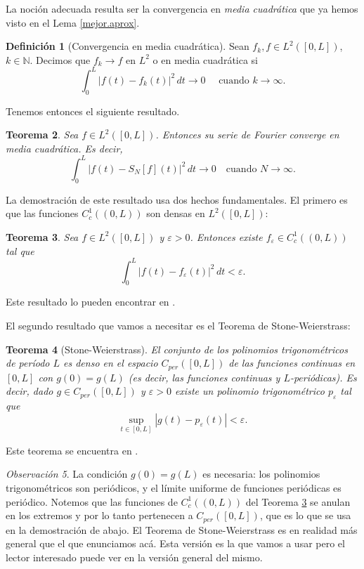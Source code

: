 \documentclass[12pt, a4paper]{amsbook}
\newcommand{\ve}{\varepsilon}
\newcommand{\N}{{\mathbb N}}
\newtheorem{teo}{Teorema}[section]
\theoremstyle{remark}
\newtheorem{obs}[teo]{Observación}
\theoremstyle{definition}
\newtheorem{defi}[teo]{Definición}
\numberwithin{section}{chapter}
\numberwithin{subsection}{section}
\numberwithin{equation}{section}
\numberwithin{figure}{chapter}
\begin{document}
La noción adecuada resulta ser la convergencia en {\em media cuadrática} que ya hemos visto en el Lema \ref{mejor.aprox}.
\begin{defi}[Convergencia en media cuadrática]
Sean $f_k, f\in L^2([0,L])$, $k\in\N$. Decimos que $f_k\to f$ en $L^2$ o en media cuadrática si
$$
\int_0^L |f(t)-f_k(t)|^2\, dt \to 0 \quad \text{ cuando } k\to\infty.
$$
\end{defi}


Tenemos entonces el siguiente resultado.
\begin{teo}\label{teo.L2}
Sea $f\in L^2([0,L])$. Entonces su serie de Fourier converge en media cuadrática. Es decir,
$$
\int_0^L |f(t) - S_N[f](t)|^2\, dt \to 0 \quad \text{cuando } N\to\infty.
$$
\end{teo}

La demostración de este resultado usa dos hechos fundamentales. El primero es que las funciones $C^1_c((0,L))$ son densas en $L^2([0,L])$:
\begin{teo}\label{densoL2}
Sea $f\in L^2([0,L])$ y $\ve>0$. Entonces existe $f_\ve\in C^1_c((0,L))$ tal que
$$
\int_0^L |f(t)-f_\ve(t)|^2\, dt < \ve.
$$
\end{teo}

Este resultado lo pueden encontrar en \cite{Zygmund}.

El segundo resultado que vamos a necesitar es el Teorema de Stone-Weierstrass:
\begin{teo}[Stone-Weierstrass]\label{teo.SW}
El conjunto de los polinomios trigonométricos de período $L$ es denso en el espacio $C_{per}([0,L])$ de las funciones continuas en $[0,L]$ con $g(0)=g(L)$ (es decir, las funciones continuas y $L$-periódicas). Es decir, dado $g\in C_{per}([0,L])$ y $\ve>0$ existe un polinomio trigonométrico $p_\ve$ tal que
$$
\sup_{t\in [0,L]} |g(t)-p_\ve(t)| < \ve.
$$
\end{teo}

Este teorema se encuentra en \cite{Rudin}.

\begin{obs}
La condición $g(0)=g(L)$ es necesaria: los polinomios trigonométricos son periódicos, y el límite uniforme de funciones periódicas es periódico. Notemos que las funciones de $C^1_c((0,L))$ del Teorema \ref{densoL2} se anulan en los extremos y por lo tanto pertenecen a $C_{per}([0,L])$, que es lo que se usa en la demostración de abajo. El Teorema de Stone-Weierstrass es en realidad más general que el que enunciamos acá. Esta versión es la que vamos a usar pero el lector interesado puede ver en \cite{Rudin} la versión general del mismo.
\end{obs}
\end{document}
